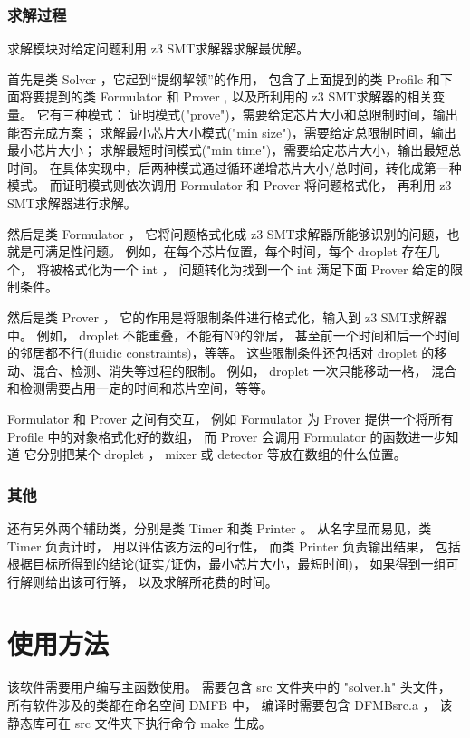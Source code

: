 \documentclass[UTF8, a4paper, titlepage]{ctexart}
\begin{document}
\subsubsection{求解过程}
求解模块对给定问题利用 z3 SMT求解器求解最优解。%

首先是类 Solver ，它起到“提纲挈领”的作用，%
包含了上面提到的类 Profile 和下面将要提到的类 Formulator 和 Prover ,%
以及所利用的 z3 SMT求解器的相关变量。%
它有三种模式：%
证明模式("prove")，需要给定芯片大小和总限制时间，输出能否完成方案；%
求解最小芯片大小模式("min size")，需要给定总限制时间，输出最小芯片大小；%
求解最短时间模式("min time")，需要给定芯片大小，输出最短总时间。%
在具体实现中，后两种模式通过循环递增芯片大小/总时间，转化成第一种模式。%
而证明模式则依次调用 Formulator 和 Prover 将问题格式化，%
再利用 z3 SMT求解器进行求解。

然后是类 Formulator ，%
它将问题格式化成 z3 SMT求解器所能够识别的问题，也就是可满足性问题。%
例如，在每个芯片位置，每个时间，每个 droplet 存在几个，%
将被格式化为一个 int ，%
问题转化为找到一个 int 满足下面 Prover 给定的限制条件。%

然后是类 Prover ，%
它的作用是将限制条件进行格式化，输入到 z3 SMT求解器中。%
例如， droplet 不能重叠，不能有N9的邻居，%
甚至前一个时间和后一个时间的邻居都不行(fluidic constraints)，等等。%
这些限制条件还包括对 droplet 的移动、混合、检测、消失等过程的限制。%
例如， droplet 一次只能移动一格，%
混合和检测需要占用一定的时间和芯片空间，等等。%

Formulator 和 Prover 之间有交互，%
例如 Formulator 为 Prover 提供一个将所有 Profile 中的对象格式化好的数组，%
而 Prover 会调用 Formulator 的函数进一步知道%
它分别把某个 droplet ， mixer 或 detector 等放在数组的什么位置。%
\subsubsection{其他}
还有另外两个辅助类，分别是类 Timer 和类 Printer 。%
从名字显而易见，类 Timer 负责计时，%
用以评估该方法的可行性，%
而类 Printer 负责输出结果，%
包括根据目标所得到的结论(证实/证伪，最小芯片大小，最短时间)，%
如果得到一组可行解则给出该可行解，%
以及求解所花费的时间。%

\section{使用方法}
该软件需要用户编写主函数使用。%
需要包含 src 文件夹中的 "solver.h" 头文件，%
所有软件涉及的类都在命名空间 DMFB 中，%
编译时需要包含 DFMBsrc.a ，%
该静态库可在 src 文件夹下执行命令 make 生成。%
\end{document}

